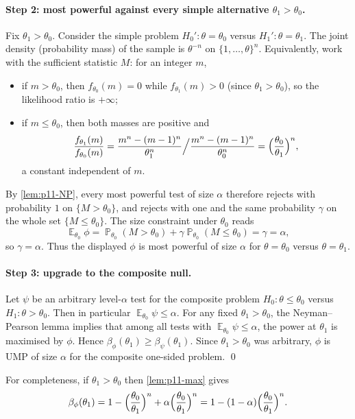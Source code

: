 \documentclass[11pt,a4paper]{article}
\DeclareMathOperator{\E}{\mathbb{E}}
\DeclareMathOperator{\Pbb}{\mathbb{P}}
\begin{document}
\paragraph{Step 2: most powerful against every simple alternative \(\theta_1>\theta_0\).}
Fix \(\theta_1>\theta_0\). Consider the simple problem \(H_0':\theta=\theta_0\) versus \(H_1':\theta=\theta_1\). The joint density (probability mass) of the sample is \(\theta^{-n}\) on \(\{1,\dots,\theta\}^n\). Equivalently, work with the sufficient statistic \(M\): for an integer \(m\),
\begin{itemize}
    \item if \(m>\theta_0\), then \(f_{\theta_0}(m)=0\) while \(f_{\theta_1}(m)>0\) (since \(\theta_1>\theta_0\)), so the likelihood ratio is \(+\infty\);
    \item if \(m\le\theta_0\), then both masses are positive and
    \[
    \frac{f_{\theta_1}(m)}{f_{\theta_0}(m)}
    =
    \frac{m^n-(m-1)^n}{\theta_1^n}
    \Big/
    \frac{m^n-(m-1)^n}{\theta_0^n}
    =
    \Bigl(\frac{\theta_0}{\theta_1}\Bigr)^n,
    \]
    a constant independent of \(m\).
\end{itemize}
By \cref{lem:p11-NP}, every most powerful test of size \(\alpha\) therefore rejects with probability \(1\) on \(\{M>\theta_0\}\), and rejects with one and the same probability \(\gamma\) on the whole set \(\{M\le\theta_0\}\). The size constraint under \(\theta_0\) reads
\[
\E_{\theta_0}\phi
=
\Pbb_{\theta_0}(M>\theta_0)+\gamma\Pbb_{\theta_0}(M\le\theta_0)
=
\gamma
=
\alpha,
\]
so \(\gamma=\alpha\). Thus the displayed \(\phi\) is most powerful of size \(\alpha\) for \(\theta=\theta_0\) versus \(\theta=\theta_1\).

\paragraph{Step 3: upgrade to the composite null.}
Let \(\psi\) be an arbitrary level-\(\alpha\) test for the composite problem \(H_0:\theta\le\theta_0\) versus \(H_1:\theta>\theta_0\). Then in particular \(\E_{\theta_0}\psi\le\alpha\). For any fixed \(\theta_1>\theta_0\), the Neyman--Pearson lemma implies that among all tests with \(\E_{\theta_0}\psi\le\alpha\), the power at \(\theta_1\) is maximised by \(\phi\). Hence \(\beta_\phi(\theta_1)\ge\beta_\psi(\theta_1)\). Since \(\theta_1>\theta_0\) was arbitrary, \(\phi\) is UMP of size \(\alpha\) for the composite one-sided problem.
\qed

\begin{remark*}
For completeness, if \(\theta_1>\theta_0\) then \cref{lem:p11-max} gives
\[
\beta_\phi(\theta_1)
=
1-\Bigl(\frac{\theta_0}{\theta_1}\Bigr)^n
+
\alpha\Bigl(\frac{\theta_0}{\theta_1}\Bigr)^n
=
1-(1-\alpha)\Bigl(\frac{\theta_0}{\theta_1}\Bigr)^n.
\]
\end{remark*}
\end{document}
